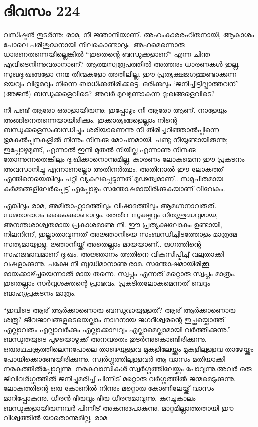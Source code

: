 \section{ദിവസം 224}


വസിഷ്ഠൻ തുടർന്നു: രാമ, നീ ജ്ഞാനിയാണ്‌.  അഹംകാരരഹിതനായി, ആകാശം പോലെ പരിശുദ്ധനായി നിലകൊണ്ടാലും. അഹമെന്നൊരു ധാരണതന്നെയില്ലെങ്കിൽ “ഇതെന്റെ ബന്ധുക്കളാണ്‌” എന്ന ചിന്ത എവിടെനിന്നുവരാനാണ്‌? ആത്മസ്വരൂപത്തിൽ അത്തരം ധാരണകൾ ഇല്ല. സുഖദു:ഖങ്ങളോ നന്മ-തിന്മകളോ അതിലില്ല. ഈ പ്രത്യക്ഷജഗത്തുണ്ടാക്കുന്ന ഭയവും വിഭ്രമവും നിന്നെ ബാധിക്കതിരിക്കട്ടെ. ഒരിക്കലും ‘ജനിച്ചിട്ടില്ലാത്തവന്‌’ (അജൻ) ബന്ധുക്കളെവിടെ? അവർ മൂലമുണ്ടാകുന്ന ദു:ഖങ്ങളെവിടെ?

നീ പണ്ട് ആരോ ഒരാളായിരുന്നു; ഇപ്പോഴും നീ ആരോ ആണ്‌.  നാളേയും അങ്ങിനെതന്നെയായിരിക്കും. ഇക്കാര്യങ്ങളെല്ലാം നിന്റെ ബന്ധുക്കളെസംബന്ധിച്ചും ശരിയാണെന്നു നീ തിരിച്ചറിഞ്ഞാൽപ്പിന്നെ ഭ്രമകൽപ്പനകളിൽ നിന്നും നിനക്കു മോചനമായി. പണ്ടു നീയുണ്ടായിരുന്നു; ഇപ്പോഴുമുണ്ട്, എന്നാൽ ഇനി മുതൽ നീയില്ല എന്നാണു നിനക്കു തോന്നുന്നതെങ്കിലും ദു:ഖിക്കാനൊന്നുമില്ല. കാരണം  ലോകമെന്ന ഈ പ്രകടനം അവസാനിച്ചു എന്നാണല്ലോ അതിനർത്ഥം. അതിനാൽ ഈ ലോകത്ത് എന്തിനെയെങ്കിലും പറ്റി വ്യകുലപ്പെടുന്നത് മൂഢത്വമാണ്‌..  സമുചിതമായ കർമ്മങ്ങളിലേർപ്പെട്ട് എപ്പോഴും സന്തോഷമായിരിക്കുകയാണ്‌ വിവേകം.

എങ്കിലും രാമ, അമിതാഹ്ലാദത്തിലും വിഷാദത്തിലും ആമഗ്നനാവരുത്. സമതാഭാവം കൈക്കൊണ്ടാലും. അതീവ സൂക്ഷ്മവും നിത്യശുദ്ധവുമായ, അനന്തശാശ്വതമായ പ്രകാശമാണു നീ. ഈ പ്രത്യക്ഷലോകം ഉണ്ടായി, നിലനിന്ന്, ഇല്ലാതാവുന്നത് അജ്ഞാനിയെ സംബന്ധിച്ചിടത്തോളം മാത്രമേ സത്യമായുള്ളു. ജ്ഞാനിയ്ക്ക് അതെല്ലാം മായയാണ്‌..  ജഗത്തിന്റെ സഹജഭാവമാണ്‌ ദു:ഖം. അജ്ഞാനം അതിനെ വികസിപ്പിച്ച് വലുതാക്കി വഷളാക്കുന്നു. പക്ഷേ നീ ബുദ്ധിമാനാണു രാമ. സന്തോഷമായിരിക്കൂ. മായക്കാഴ്ച്ചയെന്നാൽ മായ തന്നെ. സ്വപ്നം എന്നത് മറ്റൊരു സ്വപ്നം മാത്രം. ഇതെല്ലാം സർവ്വശക്തന്റെ പ്രാഭവം. പ്രകടിതലോകമെന്നത് വെറും ബാഹ്യപ്രകടനം മാത്രം.

“ഇവിടെ ആര്‌ ആർക്കാണൊരു ബന്ധുവായുള്ളത്? ആര്‌ ആർക്കാണൊരു ശത്രു? ജീവജാലങ്ങളുടെയെല്ലാം നാഥനായ ജഗദീശ്വരന്റെ ഇച്ഛയ്ക്കൊത്ത് എല്ലാവരും എല്ലാവർക്കും എല്ലാക്കാലവും എല്ലാമെല്ലാമായി വർത്തിക്കുന്നു.” ബന്ധുതയുടെ പുഴയൊഴുക്ക് അനവരതം തുടർന്നുകൊണ്ടിരിക്കുന്നു. ഒരുരഥചക്രത്തിലെന്നപോലെ താഴെയുള്ളവ മുകളിലേയ്ക്കും മുകളിലുള്ളവ താഴേയ്ക്കും പോയിക്കൊണ്ടേയിരിക്കുന്നു. സ്വർഗ്ഗത്തിലുള്ളവർ ആ വാസം മതിയാക്കി നരകത്തിൽപ്പോവുന്നു. നരകവാസികൾ സ്വർഗ്ഗത്തിലേയ്ക്കും പോവുന്നു.അവർ ഒരു ജീവിവർഗ്ഗത്തിൽ ജനിച്ചുമരിച്ച് പിന്നീട് മറ്റൊരു വർഗ്ഗത്തിൽ ജന്മമെടുക്കുന്നു. ലോകത്തിന്റെ ഒരു കോണിൽ നിന്നും മറ്റൊരു കോണിലേയ്ക്ക് വാസം മാറിപ്പോകുന്നു. ധീരൻ ഭീരുവും ഭീരു ധീരനുമാവുന്നു. കുറച്ചുകാലം ബന്ധുക്കളായിരുന്നവർ പിന്നീട് അകന്നുപോകുന്നു. മാറ്റമില്ലാത്തതായി ഈ വിശ്വത്തിൽ യാതൊന്നുമില്ല, രാമ.

